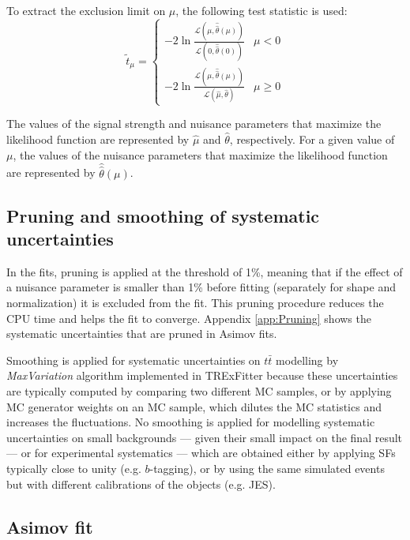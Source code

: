 To extract the exclusion limit on ${\mu}$, the following test statistic is used:
\begin{equation}
  \tilde{t}_{\mu} =
  \begin{cases}
    -2\ln{\frac{\mathcal{L}(\mu, \hat{\hat{\theta}}(\mu))}{\mathcal{L}(0, \hat{\hat{\theta}}(0))}} & {\mu}<0\\
    -2\ln{\frac{\mathcal{L}(\mu, \hat{\hat{\theta}}(\mu))}{\mathcal{L}(\hat{\mu}, \hat{\theta})}}  & {\mu}{\geq}0
  \end{cases}
\end{equation}

The values of the signal strength and nuisance parameters that maximize the likelihood function are represented by $\hat{\mu}$ and $\hat{\theta}$, respectively. For a given value of $\mu$, the values of the nuisance parameters that maximize the likelihood function are represented by $\hat{\hat{\theta}}(\mu)$.

\subsection{Pruning and smoothing of systematic uncertainties}
\label{subsec:PruningAndSmoothing}
In the fits, pruning is applied at the threshold of 1\%, meaning that if the effect of a nuisance parameter is smaller than 1\% before fitting (separately for shape and normalization) it is excluded from the fit. This pruning procedure reduces the CPU time and helps the fit to converge. Appendix \ref{app:Pruning} shows the systematic uncertainties that are pruned in Asimov fits. 

Smoothing is applied for systematic uncertainties on $t\bar{t}$ modelling by \textit{MaxVariation} algorithm implemented in TRExFitter because these uncertainties are typically computed by comparing two different MC samples, or by applying MC generator weights on an MC sample, which dilutes the MC statistics and increases the fluctuations. No smoothing is applied for modelling systematic uncertainties on small backgrounds --- given their small impact on the final result --- or for experimental systematics --- which are obtained either by applying SFs typically close to unity (e.g. $b$-tagging), or by using the same simulated events but with different calibrations of the objects (e.g. JES).

\subsection{Asimov fit}
\label{subsec:AsimovFit}

